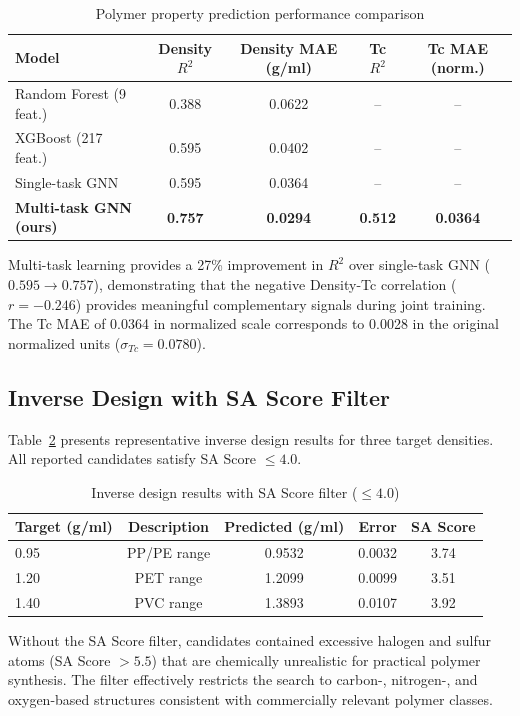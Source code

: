 \documentclass{article}
\begin{document}
\begin{table}[h]
\centering
\caption{Polymer property prediction performance comparison}
\label{tab:results}
\begin{tabular}{lcccc}
\toprule
Model & Density $R^2$ & Density MAE (g/ml) & Tc $R^2$ & Tc MAE (norm.) \\
\midrule
Random Forest (9 feat.) & 0.388 & 0.0622 & -- & -- \\
XGBoost (217 feat.) & 0.595 & 0.0402 & -- & -- \\
Single-task GNN & 0.595 & 0.0364 & -- & -- \\
\textbf{Multi-task GNN (ours)} & \textbf{0.757} & \textbf{0.0294} & \textbf{0.512} & \textbf{0.0364} \\
\bottomrule
\end{tabular}
\end{table}

Multi-task learning provides a 27\% improvement in $R^2$ over single-task GNN
($0.595 \rightarrow 0.757$), demonstrating that the negative Density-Tc correlation
($r = -0.246$) provides meaningful complementary signals during joint training.
The Tc MAE of 0.0364 in normalized scale corresponds to 0.0028 in
the original normalized units ($\sigma_{Tc} = 0.0780$).

\subsection{Inverse Design with SA Score Filter}

Table~\ref{tab:inverse} presents representative inverse design results for
three target densities. All reported candidates satisfy SA Score $\leq 4.0$.

\begin{table}[h]
\centering
\caption{Inverse design results with SA Score filter ($\leq 4.0$)}
\label{tab:inverse}
\begin{tabular}{lcccc}
\toprule
Target (g/ml) & Description & Predicted (g/ml) & Error & SA Score \\
\midrule
0.95 & PP/PE range & 0.9532 & 0.0032 & 3.74 \\
1.20 & PET range   & 1.2099 & 0.0099 & 3.51 \\
1.40 & PVC range   & 1.3893 & 0.0107 & 3.92 \\
\bottomrule
\end{tabular}
\end{table}

Without the SA Score filter, candidates contained excessive halogen and
sulfur atoms (SA Score $> 5.5$) that are chemically unrealistic for
practical polymer synthesis. The filter effectively restricts the search
to carbon-, nitrogen-, and oxygen-based structures consistent with
commercially relevant polymer classes.
\end{document}
